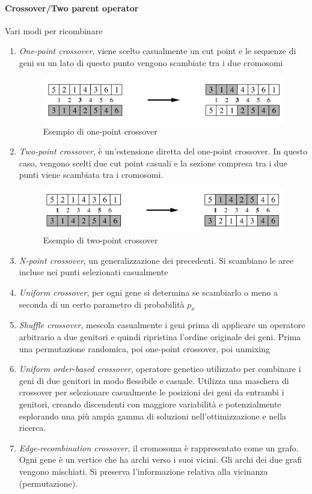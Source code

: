 \paragraph{Crossover/Two parent operator}
Vari modi per ricombinare
\begin{enumerate}
    \item \textit{One-point crossover}, viene scelto casualmente un cut point e le sequenze di geni su un lato di questo punto vengono scambiate tra i due cromosomi 
    \begin{figure}[h]
        \centering
        \includegraphics[scale=0.35]{images/one-point-crossover.png}
        \caption{Esempio di one-point crossover}
    \end{figure}
    \item \textit{Two-point crossover}, è un'estensione diretta del one-point crossover. In questo caso, vengono scelti due cut point casuali e la sezione compresa tra i due punti  viene scambiata tra i cromosomi.
    \begin{figure}[h]
        \centering
        \includegraphics[scale=0.35]{images/two-point-crossover.png}
        \caption{Esempio di two-point crossover}
    \end{figure}
    \item \textit{N-point crossover}, un generalizzazione dei precedenti. Si scambiano le aree incluse nei punti selezionati casualmente
    \item \textit{Uniform crossover}, per ogni gene si determina se scambiarlo o meno a seconda di un certo parametro di probabilità $p_x$
    \item \textit{Shuffle crossover}, mescola casualmente i geni prima di applicare un operatore arbitrario a due genitori e quindi ripristina l'ordine originale dei geni. Prima una permutazione randomica, poi one-point crossover, poi unmixing
    \item \textit{Uniform order-based crossover}, operatore genetico utilizzato per combinare i geni di due genitori in modo flessibile e casuale. Utilizza una maschera di crossover per selezionare casualmente le posizioni dei geni da entrambi i genitori, creando discendenti con maggiore variabilità e potenzialmente esplorando una più ampia gamma di soluzioni nell'ottimizzazione e nella ricerca.
    \item \textit{Edge-recombination crossover}, il cromosoma è rappresentato come un grafo. Ogni gene è un vertice che ha archi verso i suoi vicini. Gli archi dei due grafi vengono mischiati. Si preserva l’informazione relativa alla vicinanza (permutazione).
\end{enumerate}

